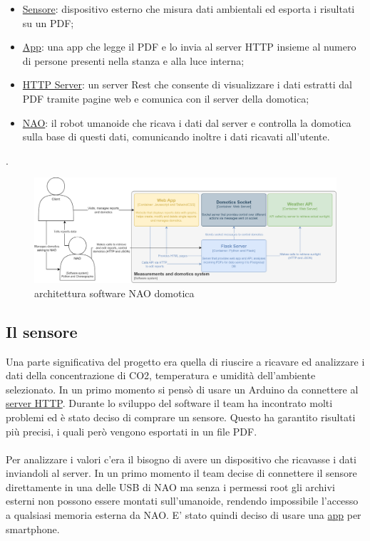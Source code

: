 \documentclass{optica-article}
\begin{document}
\begin{itemize}
    \item \hyperref[sec:domotics_sensor]{Sensore}: dispositivo esterno che misura dati ambientali ed esporta i risultati su un PDF;
    \item \hyperref[sec:domotics_app]{App}: una app che legge il PDF e lo invia al server HTTP insieme al numero di persone presenti nella stanza e alla luce interna;
    \item \hyperref[sec:domotics_server]{HTTP Server}: un server Rest che consente di visualizzare i dati estratti dal PDF tramite pagine web e comunica con il server della domotica;
    \item \hyperref[sec:domotics_nao]{NAO}: il robot umanoide che ricava i dati dal server e controlla la domotica sulla base di questi dati, comunicando inoltre i dati ricavati all'utente.
\end{itemize}.

\begin{figure}[H]
    \centering
    \includegraphics[scale=0.17]{figures/architecture_domotics.png}
    \caption{architettura software NAO domotica}
    \label{fig:my_label}
\end{figure}

\bigskip
\subsection{Il sensore}\label{sec:domotics_sensor}
\vspace{5pt}
Una parte significativa del progetto era quella di riuscire a ricavare ed analizzare i dati della concentrazione di CO2, temperatura e umidità dell'ambiente selezionato. In un primo momento si pensò di usare un Arduino da connettere al \hyperref[sec:domotics_server]{server HTTP}. Durante lo sviluppo del software il team ha incontrato molti problemi ed è stato deciso di comprare un sensore. Questo ha garantito risultati più precisi, i quali però vengono esportati in un file PDF.\\
\\Per analizzare i valori c'era il bisogno di avere un dispositivo che ricavasse i dati inviandoli al server. In un primo momento il team decise di connettere il sensore direttamente in una delle USB di NAO ma senza i permessi root gli archivi esterni non possono essere montati sull'umanoide, rendendo impossibile l'accesso a qualsiasi memoria esterna da NAO. E' stato quindi deciso di usare una \hyperref[sec:domotics_app]{app} per smartphone.\\
\end{document}
